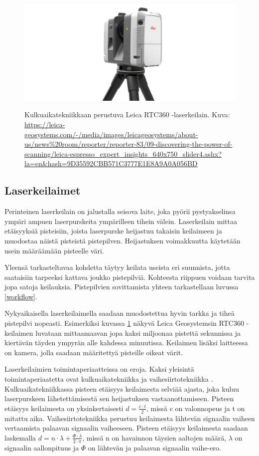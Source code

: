 \begin{figure}
    \centering
    \includegraphics[width=0.7\paperwidth]{img/leica.jpg}
    \label{leica}
    \caption{Kulkuaikatekniikkaan perustuva Leica RTC360 -laserkeilain. Kuva: \url{https://leica-geosystems.com/-/media/images/leicageosystems/about-us/news\%20room/reporter/reporter-83/09-discovering-the-power-of-scanning/leica-espresso_expert_insights_640x750_slider4.ashx?la=en&hash=9D35592CBB571C3777E1E8A9A0A056BD}}
\end{figure}


\subsection{Laserkeilaimet}

Perinteinen laserkeilain on jalustalla seisova laite, joka pyörii pystyakselinsa ympäri ampuen laserpurskeita ympärilleen tihein välein. Laserkeilain mittaa etäisyyksiä pisteisiin, joista laserpurske heijastuu takaisin keilaimeen ja muodostaa näistä pisteistä pistepilven. Heijastuksen voimakkuutta käytetään usein määräämään pisteelle väri. 

Yleensä tarkasteltavaa kohdetta täytyy keilata useista eri suunnista, jotta saataisiin tarpeeksi kattava joukko pistepilviä. Kohteesta riippuen voidaan tarvita jopa satoja keilauksia. Pistepilvien sovittamista yhteen tarkastellaan luvussa \ref{workflow}.

Nykyaikaisella laserkeilaimella saadaan muodostettua hyvin tarkka ja tiheä pistepilvi nopeasti. Esimerkiksi kuvassa \ref{leica} näkyvä Leica Geosystemsin RTC360 -keilaimen luvataan mittaamaavan jopa kaksi miljoonaa pistettä sekunnissa ja kiertävän täyden ympyrän alle kahdessa minuutissa. Keilaimen lisäksi laitteessa on kamera, jolla saadaan määritettyä pisteille oikeat värit. \cite{leica} 

Laserkeilaimien toimintaperiaatteissa on eroja. Kaksi yleisintä toimintaperiaatetta ovat kulkuaikatekniikka  ja vaihesiirtotekniikka . Kulkuaikatekniikkassa pisteen etäisyys keilaimesta selviää ajasta, joka kuluu laserpurskeen lähetettämisestä sen heijastuksen vastaanottamiseen. Pisteen etäisyys keilaimesta on yksinkertaisesti $d=\frac{c\cdot t}{2}$, missä c on valonnopeus ja t on mitattu aika. \cite{fabritius}   
Vaihesiirtotekniikka perustuu keilaimesta lähtevän signaalin vaiheen vertaamista palaavan signaalin vaiheeseen. Pisteen etäisyys keilaimesta saadaan laskemalla $d=n\cdot \lambda + \frac{\Phi \cdot \lambda}{2 \cdot \pi}$, missä n on havainnon täysien aaltojen määrä, $\lambda$ on signaalin aallonpituus ja $\Phi$ on lähtevän ja palaavan signaalin vaihe-ero. \cite{fabritius}

